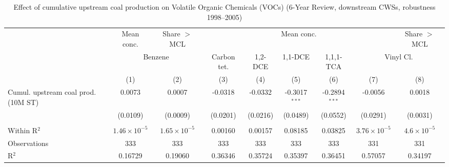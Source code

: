 
\begin{table}[htbp]
   
   \caption{\label{tab:6yr_huc02fe_voc_2005} Effect of cumulative upstream coal production on Volatile Organic Chemicals (VOCs) (6-Year Review, downstream CWSs, robustness 1998--2005)}
   \bigskip
   
   \centering
   
   \begin{adjustbox}{width = \textwidth, center}
      
      
      \begin{tabular}{lcccccccc}
         \toprule
         
          & Mean conc. & Share $>$ MCL & \multicolumn{5}{c}{Mean conc.} & Share $>$ MCL\\
         
          & \multicolumn{2}{c}{Benzene} & Carbon tet. & 1,2-DCE & 1,1-DCE & 1,1,1-TCA & \multicolumn{2}{c}{Vinyl Cl.} \\ 
         
                                             & (1)                   & (2)                   & (3)           & (4)           & (5)             & (6)             & (7)                   & (8)\\  
         
         \midrule 
         Cumul. upstream coal prod. (10M ST) & 0.0073                & 0.0007                & -0.0318       & -0.0332       & -0.3017$^{***}$ & -0.2894$^{***}$ & -0.0056               & 0.0018\\   
                                             & (0.0109)              & (0.0009)              & (0.0201)      & (0.0216)      & (0.0489)        & (0.0552)        & (0.0291)              & (0.0031)\\   
         
          \\
         
         Within R$^2$                        & $1.46\times 10^{-5}$  & $1.65\times 10^{-5}$  & 0.00160       & 0.00157       & 0.08185         & 0.03825         & $3.76\times 10^{-5}$  & $4.6\times 10^{-5}$\\   
         Observations                        & 333                   & 333                   & 333           & 333           & 333             & 333             & 331                   & 331\\  
         R$^2$                               & 0.16729               & 0.19060               & 0.36346       & 0.35724       & 0.35397         & 0.36451         & 0.57057               & 0.34197\\  
         

\end{tabular}
\end{adjustbox}
\end{table}
